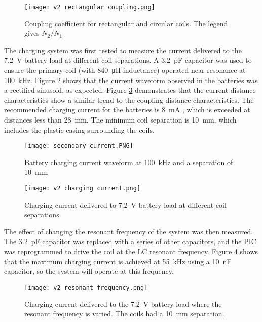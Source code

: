 \begin{figure}[ht]
	\centering
	\texttt{[image: v2 rectangular coupling.png]}
	\caption{Coupling coefficient for rectangular and circular coils. The legend gives $N_2/N_1$}
	\label{fig: rectangular coupling}
\end{figure}

The charging system was first tested to measure the current delivered to the \SI{7.2}{\volt} battery load at different coil separations. A \SI{3.2}{\pico\farad} capacitor was used to ensure the primary coil (with \SI{840}{\micro\henry} inductance) operated near resonance at \SI{100}{\kilo\hertz}. Figure \ref{fig: secondary current} shows that the current waveform observed in the batteries was a rectified sinusoid, as expected. Figure \ref{fig: current distance} demonstrates that the current-distance characteristics show a similar trend to the coupling-distance characteristics. The recommended charging current for the batteries is \SI{8}{\milli\ampere} \cite{rs_pro_batteries}, which is exceeded at distances less than \SI{28}{\milli\metre}. The minimum coil separation is \SI{10}{\milli\metre}, which includes the plastic casing surrounding the coils.\\

\begin{figure}[ht]
	\centering
	\texttt{[image: secondary current.PNG]}
	\caption{Battery charging current waveform at \SI{100}{\kilo\hertz} and a separation of \SI{10}{\milli\metre}.}
	\label{fig: secondary current}
\end{figure}

\begin{figure}[ht]
	\centering
	\texttt{[image: v2 charging current.png]}
	\caption{Charging current delivered to \SI{7.2}{\volt} battery load at different coil separations.}
	\label{fig: current distance}
\end{figure}

The effect of changing the resonant frequency of the system was then measured. The \SI{3.2}{\pico\farad} capacitor was replaced with a series of other capacitors, and the PIC was reprogrammed to drive the coil at the LC resonant frequency. Figure \ref{fig: current resonance} shows that the maximum charging current is achieved at \SI{55}{\kilo\hertz} using a \SI{10}{\nano\farad} capacitor, so the system will operate at this frequency.\\ 

\begin{figure}[ht]
	\centering
	\texttt{[image: v2 resonant frequency.png]}
	\caption{Charging current delivered to the \SI{7.2}{\volt} battery load where the resonant frequency is varied. The coils had a \SI{10}{\milli\metre} separation.}
	\label{fig: current resonance}
\end{figure}

